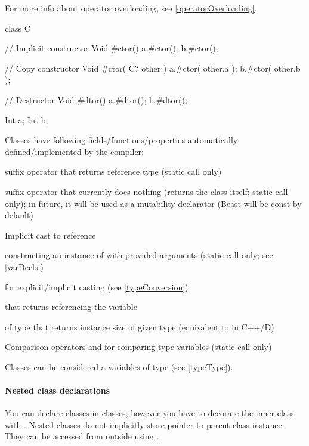 For more info about operator overloading, see \autoref{operatorOverloading}.

\begin{code}
class C {

	// Implicit constructor
	Void #ctor() {
		a.#ctor();
		b.#ctor();
	}
	
	// Copy constructor
	Void #ctor( C? other ) {
		a.#ctor( other.a );
		b.#ctor( other.b );	
	}

	// Destructor
	Void #dtor() {
		a.#dtor();
		b.#dtor();	
	}

	Int a;
	Int b;

}
\end{code}

Classes have following fields/functions/properties automatically defined/implemented by the compiler:
\begin{compactenum}
	\item {} suffix operator that returns reference type (static call only)
	\item {} suffix operator that currently does nothing (returns the class itself; static call only); in future, it will be used as a mutability declarator (Beast will be const-by-default)
	\item Implicit cast to reference
	\item {} constructing an instance of  with provided arguments (static call only; see \autoref{varDecls})
	\item {} for explicit/implicit casting (see \autoref{typeConversion})
	\item {} that returns  referencing the variable 
	\item {} of type  that returns instance size of given type (equivalent to  in C++/D)
	\item Comparison operators  and  for comparing type variables (static call only)
\end{compactenum}

Classes can be considered a \ctime variables of type  (see \autoref{typeType}).

\paragraph{Nested class declarations}
You can declare classes in classes, however you have to decorate the inner class with . Nested classes do not implicitly store pointer to parent class instance. They can be accessed from outside using .

